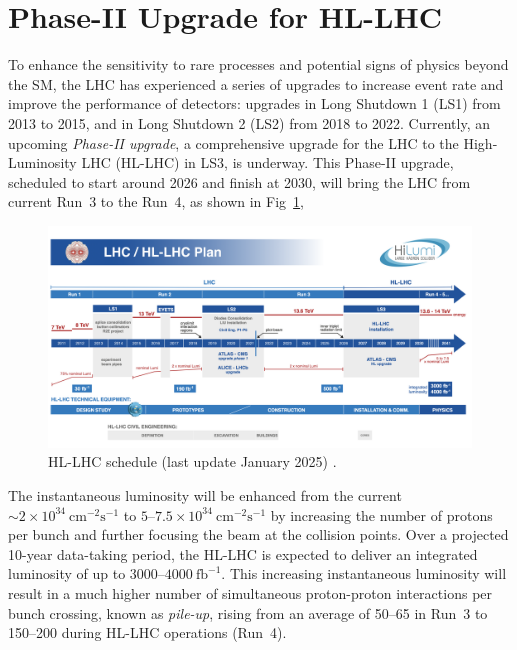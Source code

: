 \section{Phase-II Upgrade for HL-LHC} \label{sec:upgrade}
To enhance the sensitivity to rare processes and potential signs of physics beyond the SM, the LHC has experienced a series of upgrades to increase event rate and improve the performance of detectors: upgrades in Long Shutdown 1 (LS1) from 2013 to 2015, and in Long Shutdown 2 (LS2) from 2018 to 2022. Currently, an upcoming \textit{Phase-II upgrade}, a comprehensive upgrade for the LHC to the High-Luminosity LHC (HL-LHC) in LS3, is underway. This Phase-II upgrade, scheduled to start around 2026 and finish at 2030, will bring the LHC from current Run~3 to the Run~4, as shown in Fig~\ref{fig:HL-LHC},

\begin{figure}[htbp]
  \centering
  \includegraphics[width=1.0\textwidth]{figs/chapter1/HL-LHC_plan.png}
  \caption{HL-LHC schedule (last update January 2025) \cite{HL-LHC}.}
  \label{fig:HL-LHC}
\end{figure}

The instantaneous luminosity will be enhanced from the current $\sim 2 \times 10^{34}~\mathrm{cm}^{-2}\mathrm{s}^{-1}$ to $5$–$7.5 \times 10^{34}~\mathrm{cm}^{-2}\mathrm{s}^{-1}$ by increasing the number of protons per bunch and further focusing the beam at the collision points. Over a projected 10-year data-taking period, the HL-LHC is expected to deliver an integrated luminosity of up to $3000\text{–}4000~\mathrm{fb}^{-1}$. This increasing instantaneous luminosity will result in a much higher number of simultaneous proton-proton interactions per bunch crossing, known as \textit{pile-up}, rising from an average of 50–65 in Run~3 to 150–200 during HL-LHC operations (Run~4).

